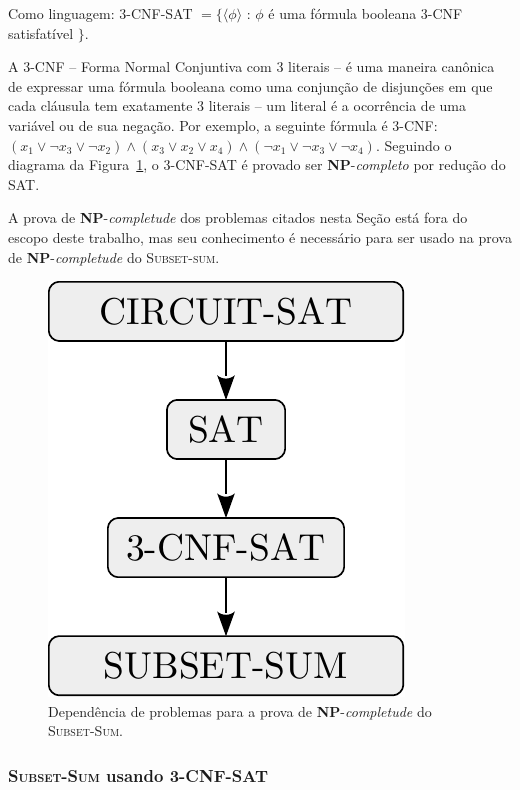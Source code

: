 Como linguagem:
\textsc{3-CNF-SAT} $= \{ \langle \phi \rangle$ : $\phi$ é uma fórmula booleana 3-CNF satisfatível $\}.$

A 3-CNF -- Forma Normal Conjuntiva com 3 literais -- é uma maneira canônica de expressar uma fórmula booleana como uma conjunção de disjunções em que cada cláusula tem exatamente 3 literais -- um literal é a ocorrência de uma variável ou de sua negação. Por exemplo, a seguinte fórmula é 3-CNF: $(x_1 \lor \lnot x_3 \lor \lnot x_2) \land (x_3 \lor x_2 \lor x_4) \land (\lnot x_1 \lor \lnot x_3 \lor \lnot x_4)$. Seguindo o diagrama da Figura~\ref{fig:sat}, o \textsc{3-CNF-SAT} é provado ser \textbf{NP}-\textit{completo} por redução do \textsc{SAT}.

A prova de \textbf{NP}-\textit{completude} dos problemas citados nesta Seção está fora do escopo deste trabalho, mas seu conhecimento é necessário para ser usado na prova de \textbf{NP}-\textit{completude} do \textsc{Subset-sum}.

\begin{figure}[h]
	\centering
	\includegraphics[scale=0.7]{./input/sat.pdf}
	\caption{Dependência de problemas para a prova de \textbf{NP}-\textit{completude} do \textsc{Subset-Sum}. \label{fig:sat}}
\end{figure}

\subsubsection{\textsc{Subset-Sum} usando \textsc{3-CNF-SAT}}

